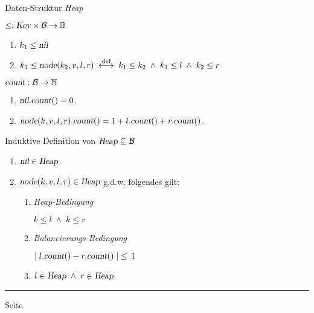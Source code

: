 \documentclass{slides}
\newcounter{mypage}
\begin{document}
\begin{slide}{}
\normalsize

\begin{center}
Daten-Struktur \textsl{Heap}
\end{center}
\vspace*{0.5cm}

\footnotesize
\hspace*{1.2cm}  $\leq: \textsl{Key} \times \mathcal{B} \rightarrow \mathbb{B}$
\begin{enumerate}
\item $k_1 \leq \textsl{nil}$
\item $k_1 \leq \textsl{node}(k_2,v,l,r) 
       \;\stackrel{\mbox{\scriptsize def}}{\longleftrightarrow}\; 
       k_1 \leq k_2 \;\wedge\; k_1 \leq l \;\wedge\; k_2 \leq r$         
\end{enumerate}

\hspace*{1.2cm}  $\textsl{count}: \mathcal{B} \rightarrow \mathbb{N}$
\begin{enumerate}
\item $\textsl{nil}.\textsl{count}() = 0$.
\item $\textsl{node}(k,v,l,r).\textsl{count}() = 1 + l.\textsl{count}() + r.\textsl{count}()$.
\end{enumerate}

Induktive Definition von $\textsl{Heap} \subseteq \mathcal{B}$
\begin{enumerate}
\item $\textsl{nil} \in \textsl{Heap}$.
\item $\textsl{node}(k,v,l,r) \in \textsl{Heap}$ g.d.w. folgendes gilt:
      \begin{enumerate}
      \item \emph{Heap-Bedingung}

            $k \leq l \;\wedge\; k \leq r$ 
      \item \emph{Balancierungs-Bedingung}

            $\mid l.\textsl{count}() - r.\textsl{count}() \mid \;\leq\, 1$
      \item $l \in \textsl{Heap} \;\wedge\; r \in \textsl{Heap}$.
      \end{enumerate}
\end{enumerate}



\vspace*{\fill}
\tiny \addtocounter{mypage}{1}
\rule{17cm}{1mm}
 \hspace*{\fill} Seite 
\end{slide}
\end{document}

